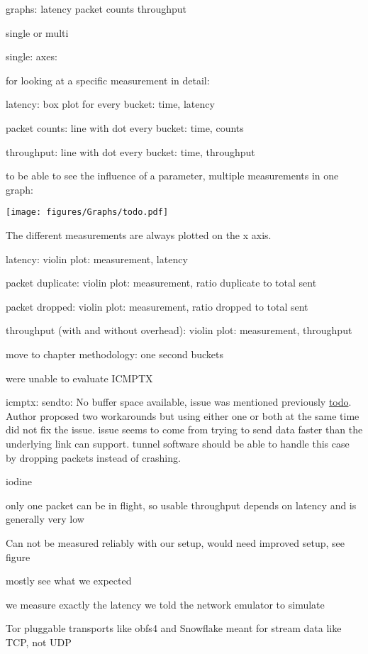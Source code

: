 graphs:
latency
packet counts
throughput

single or multi

single: axes:

for looking at a specific measurement in detail:

latency: box plot for every bucket: time, latency

packet counts: line with dot every bucket: time, counts

throughput: line with dot every bucket: time, throughput


to be able to see the influence of a parameter, multiple measurements in one graph:

\texttt{[image: figures/Graphs/todo.pdf]}

The different measurements are always plotted on the x axis.

latency: violin plot: measurement, latency

packet duplicate: violin plot: measurement, ratio duplicate to total sent

packet dropped: violin plot: measurement, ratio dropped to total sent

throughput (with and without overhead): violin plot: measurement, throughput


move to chapter methodology:
one second buckets


were unable to evaluate ICMPTX

icmptx: sendto: No buffer space available, issue was mentioned previously \href{https://github.com/jakkarth/icmptx/issues/1}{todo}.
Author proposed two workarounds but using either one or both at the same time did not fix the issue.
issue seems to come from trying to send data faster than the underlying link can support.
tunnel software should be able to handle this case by dropping packets instead of crashing.


iodine

only one packet can be in flight, so usable throughput depends on latency and is generally very low

Can not be measured reliably with our setup, would need improved setup, see figure



mostly see what we expected

we measure exactly the latency we told the network emulator to simulate

Tor pluggable transports like obfs4 and Snowflake
meant for stream data like TCP, not UDP

